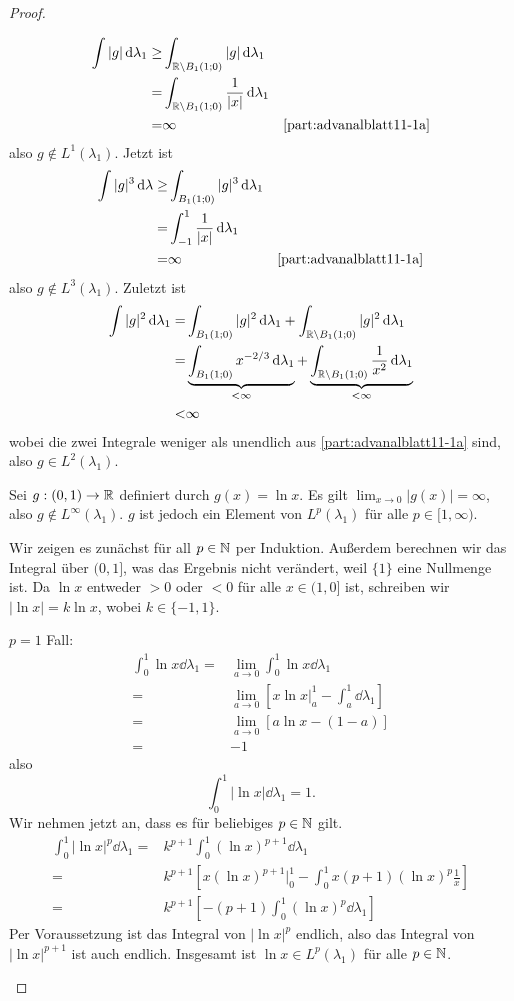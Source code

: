 \begin{proof}
\begin{parts}
	\begin{align*}
		\int |g|\dd{\lambda_1}\ge& \int_{\mathbb{R} \backslash B_1(1;0)} |g|\dd{\lambda_1}\\
		=&\int_{\mathbb{R}\backslash B_1(1;0)} \frac{1}{|x|}\dd{\lambda_1}\\
		=&\infty & \text{\ref{part:advanalblatt11-1a}}
	\end{align*}
	also $g\not\in L^1(\lambda_1)$. Jetzt ist
	\begin{align*}
		\int |g|^3 \dd{\lambda}\ge& \int_{B_1(1;0)} |g|^3 \dd{\lambda_1}\\
		=& \int_{-1}^1 \frac{1}{|x|}\dd{\lambda_1}\\
		=&\infty & \text{\ref{part:advanalblatt11-1a}}
	\end{align*}
	also $g\not\in L^3(\lambda_1)$. Zuletzt ist
	\begin{align*}
		\int |g|^2\dd{\lambda_1}=& \int_{B_1(1;0)}|g|^2\dd{\lambda_1}+\int_{\mathbb{R}\backslash B_1(1;0)}|g|^2\dd{\lambda_1}\\
		=&\underbrace{\int_{B_1(1;0)} x^{-2 / 3}\dd{\lambda_1}}_{<\infty}+\underbrace{\int_{\mathbb{R}\backslash B_1(1;0)} \frac{1}{x^2}\dd{\lambda_1}}_{<\infty}\\
		<& \infty
	\end{align*}
	wobei die zwei Integrale weniger als unendlich aus \ref{part:advanalblatt11-1a} sind, also $g\in L^2(\lambda_1)$. 
\item Sei $g:(0,1)\to \mathbb{R}$ definiert durch $g(x)=\ln x$. Es gilt $\lim_{x \to 0} |g(x)|=\infty$, also $g\not\in L^\infty(\lambda_1)$. $g$ ist jedoch ein Element von $L^p(\lambda_1)$ f\"{u}r alle $p\in [1,\infty)$. 

	Wir zeigen es zunächst für all $p\in \mathbb{N}$ per Induktion. Außerdem berechnen wir das Integral über $(0,1]$, was das Ergebnis nicht verändert, weil $\{1\} $ eine Nullmenge ist. Da $\ln x$ entweder $>0$ oder $<0$ f\"{u}r alle $x\in (1,0]$ ist, schreiben wir $|\ln x|=k\ln x$, wobei $k\in \{-1,1\} $. 

	$p=1$ Fall:
	\begin{align*}
		\int_0^1 \ln x\dd{\lambda_1}=&\lim_{a \to 0} \int_0^1 \ln x\dd{\lambda_1}\\
		=&\lim_{a \to 0}\left[ x\ln x|_a^1 - \int_a^1 \dd{\lambda_1} \right] \\
		=&\lim_{a \to 0} \left[ a\ln x-(1-a) \right] \\
		=&-1
	\end{align*}
	also
	\[
		\int_0^1 |\ln x|\dd{\lambda_1}=1
	.\] 
	Wir nehmen jetzt an, dass es f\"{u}r beliebiges $p\in \mathbb{N}$ gilt. 
	\begin{align*}
		\int_0^1 |\ln x|^{p}\dd{\lambda_1}=& k^{p+1} \int_0^1 (\ln x)^{p+1}\dd{\lambda_1}\\
		=&k^{p+1}\left[ x(\ln x)^{p+1}|_0^1-\int_0^1 x(p+1)(\ln x)^p \frac{1}{x} \right] \\
		=&k^{p+1}\left[ -(p+1)\int_0^1(\ln x)^p\dd{\lambda_1}\right] 
	\end{align*}
	Per Voraussetzung ist das Integral von $|\ln x|^p$ endlich, also das Integral von $|\ln x|^{p+1}$ ist auch endlich. Insgesamt ist $\ln x\in L^p(\lambda_1)$ f\"{u}r alle $p\in \mathbb{N}$.


\end{parts}
\end{proof}
